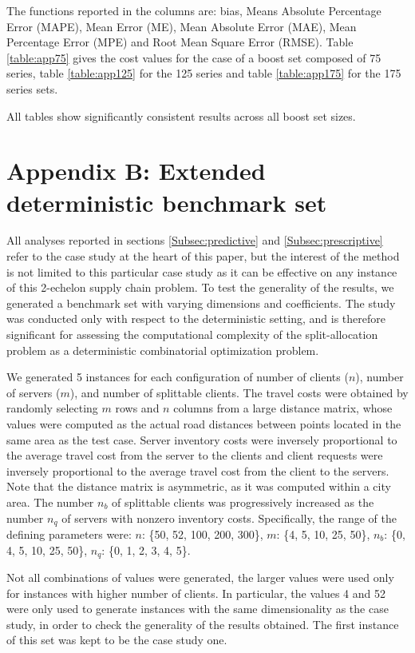 \documentclass[11pt]{article}
\begin{document}
The functions reported in the columns are: bias, Means Absolute Percentage Error (MAPE), Mean Error (ME), Mean Absolute Error (MAE), Mean Percentage Error (MPE) and Root Mean Square Error (RMSE). Table \ref{table:app75} gives the cost values for the case of a boost set composed of 75 series, table \ref{table:app125} for the 125 series and table \ref{table:app175} for the 175 series sets.

All tables show significantly consistent results across all boost set sizes.

\section{Appendix B: Extended deterministic benchmark set} \label{app:artificial}

All analyses reported in sections \ref{Subsec:predictive} and \ref{Subsec:prescriptive} refer to the case study at the heart of this paper, but the interest of the method is not limited to this particular case study as it can be effective on any instance of this 2-echelon supply chain problem. To test the generality of the results, we generated a benchmark set with varying dimensions and coefficients. The study was conducted only with respect to the deterministic setting, and is therefore significant for assessing the computational complexity of the split-allocation problem as a deterministic combinatorial optimization problem.

We generated 5 instances for each configuration of number of clients ($n$), number of servers ($m$), and number of splittable clients. The travel costs were obtained by randomly selecting $m$ rows and $n$ columns from a large distance matrix, whose values were computed as the actual road distances between points located in the same area as the test case. Server inventory costs were inversely proportional to the average travel cost from the server to the clients and client requests were inversely proportional to the average travel cost from the client to the servers. Note that the distance matrix is asymmetric, as it was computed within a city area. The number $n_b$ of splittable clients was progressively increased as the number $n_q$ of servers with nonzero inventory costs. Specifically, the range of the defining parameters were: $n$: \{50, 52, 100, 200, 300\}, $m$: \{4, 5, 10, 25, 50\}, $n_b$: \{0, 4, 5, 10, 25, 50\}, $n_q$: \{0, 1, 2, 3, 4, 5\}.

Not all combinations of values were generated, the larger values were used only for instances with higher number of clients. In particular, the values 4 and 52 were only used to generate instances with the same dimensionality as the case study, in order to check the generality of the results obtained. The first instance of this set was kept to be the case study one.
\end{document}

